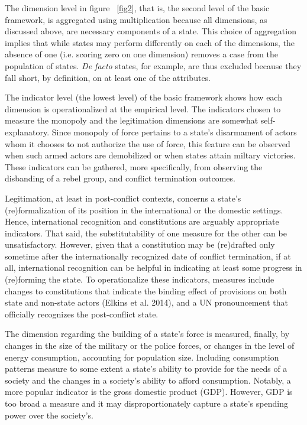 \documentclass [11pt]{article}
\begin{document}
The dimension level in figure ~\ref{fig2}, that is, the second level of the basic framework, is aggregated using multiplication because all dimensions, as discussed above, are necessary components of a state. This choice of aggregation implies that while states may perform differently on each of the dimensions, the absence of one (i.e. scoring zero on one dimension) removes a case from the population of states. \emph{De facto} states, for example, are thus excluded because they fall short, by definition, on at least one of the attributes.


The indicator level (the lowest level) of the basic framework shows how each dimension is operationalized at the empirical level. The indicators chosen to measure the monopoly and the legitimation dimensions are somewhat self-explanatory. Since monopoly of force pertains to a state's disarmament of actors whom it chooses to not authorize the use of force, this feature can be observed when such armed actors are demobilized or when states attain miltary victories. These indicators can be gathered, more specifically, from observing the disbanding of a rebel group, and conflict termination outcomes.

Legitimation, at least in post-conflict contexts, concerns a state's (re)formalization of its position in the international or the domestic settings. Hence, international recognition and constitutions are arguably appropriate indicators. That said, the substitutability of one measure for the other can be unsatisfactory. However, given that a constitution may be (re)drafted only sometime after the internationally recognized date of conflict termination, if at all, international recognition can be helpful in indicating at least some progress in (re)forming the state. To operationalize these indicators, measures include changes to constitutions that indicate the binding effect of provisions on both state and non-state actors (Elkins et al. 2014), and a UN pronouncement that officially recognizes the post-conflict state.

The dimension regarding the building of a state's force is measured, finally, by changes in the size of the military or the police forces, or changes in the level of energy consumption, accounting for population size. Including consumption patterns measure to some extent a state's ability to provide for the needs of a society and the changes in a society's ability to afford consumption. Notably, a more popular indicator is the gross domestic product (GDP). However, GDP is too broad a measure and it may disproportionately capture a state's spending power over the society's.
\end{document}
